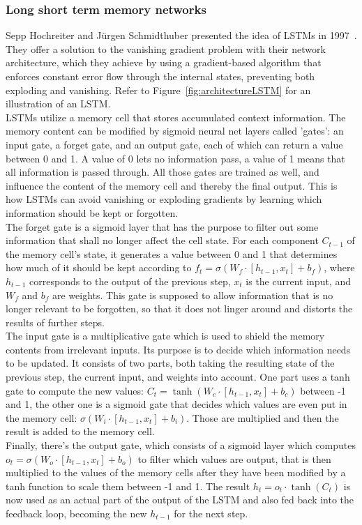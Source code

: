 \documentclass[
a4paper,
pagesize,
pdftex,
12pt,
ngerman,
fleqn,
final,
]{scrartcl}
\begin{document}
	\subsubsection{Long short term memory networks}\label{LSTM}
	Sepp Hochreiter and Jürgen Schmidthuber presented the idea of LSTMs in 1997~\cite{Hochreiter.1997}. They offer a solution to the vanishing gradient problem with their network architecture, which they achieve by using a gradient-based algorithm that enforces constant error flow through the internal states, preventing both exploding and vanishing. Refer to Figure~\ref{fig:architectureLSTM} for an illustration of an LSTM.\\
	LSTMs utilize a memory cell that stores accumulated context information. The memory content can be modified by sigmoid neural net layers called 'gates': an input gate, a forget gate, and an output gate, each of which can return a value between 0 and 1. A value of 0 lets no information pass, a value of 1 means that all information is passed through. All those gates are trained as well, and influence the content of the memory cell and thereby the final output. This is how LSTMs can avoid vanishing or exploding gradients by learning which information should be kept or forgotten.\\
	The forget gate is a sigmoid layer that has the purpose to filter out some information that shall no longer affect the cell state. For each component $C_{t-1}$ of the memory cell's state, it generates a value between 0 and 1 that determines how much of it should be kept according to $f_t = \sigma (W_f \cdot [h_{t-1}, x_t] + b_f)$, where $h_{t-1}$ corresponds to the output of the previous step, $x_t$ is the current input, and $W_f$ and $b_f$ are weights. This gate is supposed to allow information that is no longer relevant to be forgotten, so that it does not linger around and distorts the results of further steps.\\
	The input gate is a multiplicative gate which is used to shield the memory contents from irrelevant inputs. Its purpose is to decide which information needs to be updated. It consists of two parts, both taking the resulting state of the previous step, the current input, and weights into account. One part uses a tanh gate to compute the new values: $C_t = \tanh (W_c \cdot [h_{t-1} , x_t] + b_c)$ between -1 and 1, the other one is a sigmoid gate that decides which values are even put in the memory cell: $\sigma (W_i \cdot [h_{t-1}, x_t] + b_i)$. Those are multiplied and then the result is added to the memory cell.\\
	Finally, there's the output gate, which consists of a sigmoid layer which computes $o_t = \sigma (W_o \cdot [h_{t-1}, x_t] + b_o)$ to filter which values are output, that is then multiplied to the values of the memory cells after they have been modified by a tanh function to scale them between -1 and 1. The result $h_t = o_t \cdot \tanh(C_t)$ is now used as an actual part of the output of the LSTM and also fed back into the feedback loop, becoming the new $h_{t-1}$ for the next step.	
	
\end{document}
